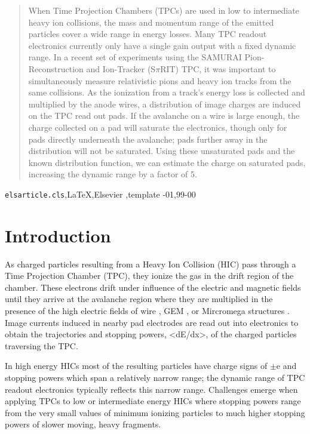 \documentclass[review]{elsarticle}
\begin{document}
\begin{frontmatter}
\begin{abstract}
When Time Projection Chambers (TPCs) are used in low to intermediate heavy ion collisions, the mass and momentum range of the emitted particles cover a wide range in energy losses. Many TPC readout electronics currently only have a single gain output with a fixed dynamic range. In a recent set of experiments using the SAMURAI Pion-Reconstruction and Ion-Tracker (S$\pi$RIT) TPC, it was important to simultaneously measure relativistic pions and heavy ion tracks from the same collisions. As the ionization from a track's energy loss is collected and multiplied by the anode wires, a distribution of image charges are induced on the TPC read out pads. If the avalanche on a wire is large enough, the charge collected on a pad will saturate the electronics, though only for pads directly underneath the avalanche; pads further away in the distribution will not be saturated. Using these unsaturated pads and the known distribution function, we can estimate the charge on saturated pads, increasing the dynamic range by a factor of 5.

\end{abstract}

\begin{keyword}
\texttt{elsarticle.cls}\sep \LaTeX\sep Elsevier \sep template
-01\sep  99-00
\end{keyword}

\end{frontmatter}

\linenumbers

\section{Introduction} 

As charged particles resulting from a Heavy Ion Collision (HIC) pass through a Time Projection Chamber (TPC), they ionize the gas in the drift region of the chamber. These electrons drift under influence of the electric and magnetic fields until they arrive at the avalanche region where they are multiplied in the presence of the high electric fields of wire \cite{blumrol}, GEM \cite{gem}, or Mircromega structures \cite{micromeg}. Image currents induced in nearby pad electrodes are read out into electronics to obtain the trajectories and stopping powers, <dE/dx>, of the charged particles traversing the TPC.

In high energy HICs most of the resulting particles have charge signs of $\pm$e and stopping powers which span a relatively narrow range; the dynamic range of TPC readout electronics typically reflects this narrow range. Challenges emerge when applying TPCs to low or intermediate energy HICs where stopping powers range from the very small values of minimum ionizing particles to much higher stopping powers of slower moving, heavy fragments. 
\end{document}
